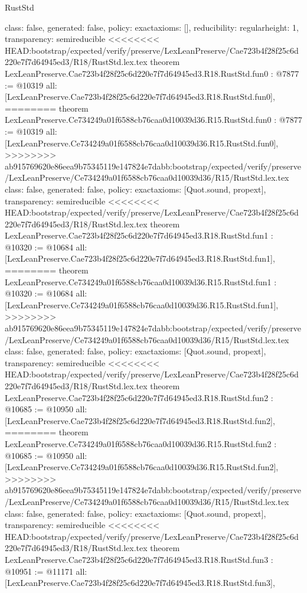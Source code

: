 \begin{lexlean}{RustStd}
\begin{coremodule}
{\begin{coremodule}
{{{  class: false,
  generated: false,
  policy: exact{axioms: []},
  reducibility: regular{height: 1},
  transparency: semireducible
}
<<<<<<<< HEAD:bootstrap/expected/verify/preserve/LexLeanPreserve/Cae723b4f28f25c6d220e7f7d64945ed3/R18/RustStd.lex.tex
theorem LexLeanPreserve.Cae723b4f28f25c6d220e7f7d64945ed3.R18.RustStd.fun0 : @7877 := @10319 {
  all: [LexLeanPreserve.Cae723b4f28f25c6d220e7f7d64945ed3.R18.RustStd.fun0],
========
theorem LexLeanPreserve.Ce734249a01f6588cb76caa0d10039d36.R15.RustStd.fun0 : @7877 := @10319 {
  all: [LexLeanPreserve.Ce734249a01f6588cb76caa0d10039d36.R15.RustStd.fun0],
>>>>>>>> ab915769620e86eea9b75345119e147824e7dabb:bootstrap/expected/verify/preserve/LexLeanPreserve/Ce734249a01f6588cb76caa0d10039d36/R15/RustStd.lex.tex
  class: false,
  generated: false,
  policy: exact{axioms: [Quot.sound, propext]},
  transparency: semireducible
}
<<<<<<<< HEAD:bootstrap/expected/verify/preserve/LexLeanPreserve/Cae723b4f28f25c6d220e7f7d64945ed3/R18/RustStd.lex.tex
theorem LexLeanPreserve.Cae723b4f28f25c6d220e7f7d64945ed3.R18.RustStd.fun1 : @10320 := @10684 {
  all: [LexLeanPreserve.Cae723b4f28f25c6d220e7f7d64945ed3.R18.RustStd.fun1],
========
theorem LexLeanPreserve.Ce734249a01f6588cb76caa0d10039d36.R15.RustStd.fun1 : @10320 := @10684 {
  all: [LexLeanPreserve.Ce734249a01f6588cb76caa0d10039d36.R15.RustStd.fun1],
>>>>>>>> ab915769620e86eea9b75345119e147824e7dabb:bootstrap/expected/verify/preserve/LexLeanPreserve/Ce734249a01f6588cb76caa0d10039d36/R15/RustStd.lex.tex
  class: false,
  generated: false,
  policy: exact{axioms: [Quot.sound, propext]},
  transparency: semireducible
}
<<<<<<<< HEAD:bootstrap/expected/verify/preserve/LexLeanPreserve/Cae723b4f28f25c6d220e7f7d64945ed3/R18/RustStd.lex.tex
theorem LexLeanPreserve.Cae723b4f28f25c6d220e7f7d64945ed3.R18.RustStd.fun2 : @10685 := @10950 {
  all: [LexLeanPreserve.Cae723b4f28f25c6d220e7f7d64945ed3.R18.RustStd.fun2],
========
theorem LexLeanPreserve.Ce734249a01f6588cb76caa0d10039d36.R15.RustStd.fun2 : @10685 := @10950 {
  all: [LexLeanPreserve.Ce734249a01f6588cb76caa0d10039d36.R15.RustStd.fun2],
>>>>>>>> ab915769620e86eea9b75345119e147824e7dabb:bootstrap/expected/verify/preserve/LexLeanPreserve/Ce734249a01f6588cb76caa0d10039d36/R15/RustStd.lex.tex
  class: false,
  generated: false,
  policy: exact{axioms: [Quot.sound, propext]},
  transparency: semireducible
}
<<<<<<<< HEAD:bootstrap/expected/verify/preserve/LexLeanPreserve/Cae723b4f28f25c6d220e7f7d64945ed3/R18/RustStd.lex.tex
theorem LexLeanPreserve.Cae723b4f28f25c6d220e7f7d64945ed3.R18.RustStd.fun3 : @10951 := @11171 {
  all: [LexLeanPreserve.Cae723b4f28f25c6d220e7f7d64945ed3.R18.RustStd.fun3],
}}}}}}
\end{coremodule}}
\end{coremodule}
\end{lexlean}
